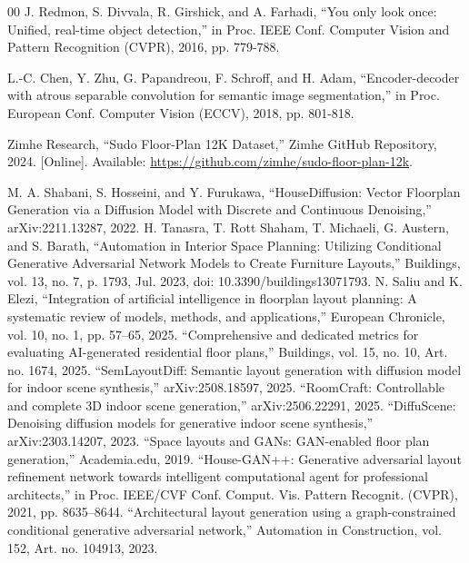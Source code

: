 \documentclass[10pt,conference]{IEEEtran}
\begin{document}
\begin{thebibliography}{00}
 J. Redmon, S. Divvala, R. Girshick, and A. Farhadi, ``You only look once: Unified, real-time object detection,'' in Proc. IEEE Conf. Computer Vision and Pattern Recognition (CVPR), 2016, pp. 779-788.

 L.-C. Chen, Y. Zhu, G. Papandreou, F. Schroff, and H. Adam, ``Encoder-decoder with atrous separable convolution for semantic image segmentation,'' in Proc. European Conf. Computer Vision (ECCV), 2018, pp. 801-818.

 Zimhe Research, ``Sudo Floor-Plan 12K Dataset,'' Zimhe GitHub Repository, 2024. [Online]. Available: \url{https://github.com/zimhe/sudo-floor-plan-12k}.

 M. A. Shabani, S. Hosseini, and Y. Furukawa, ``HouseDiffusion: Vector Floorplan Generation via a Diffusion Model with Discrete and Continuous Denoising,'' arXiv:2211.13287, 2022.
 H. Tanasra, T. Rott Shaham, T. Michaeli, G. Austern, and S. Barath, “Automation in Interior Space Planning: Utilizing Conditional Generative Adversarial Network Models to Create Furniture Layouts,” Buildings, vol. 13, no. 7, p. 1793, Jul. 2023, doi: 10.3390/buildings13071793.
 N. Saliu and K. Elezi, ``Integration of artificial intelligence in floorplan layout planning: A systematic review of models, methods, and applications,'' European Chronicle, vol. 10, no. 1, pp. 57--65, 2025.
 ``Comprehensive and dedicated metrics for evaluating AI-generated residential floor plans,'' Buildings, vol. 15, no. 10, Art. no. 1674, 2025.
 ``SemLayoutDiff: Semantic layout generation with diffusion model for indoor scene synthesis,'' arXiv:2508.18597, 2025.
 ``RoomCraft: Controllable and complete 3D indoor scene generation,'' arXiv:2506.22291, 2025.
 ``DiffuScene: Denoising diffusion models for generative indoor scene synthesis,'' arXiv:2303.14207, 2023.
 ``Space layouts and GANs: GAN-enabled floor plan generation,'' Academia.edu, 2019.
 ``House-GAN++: Generative adversarial layout refinement network towards intelligent computational agent for professional architects,'' in Proc. IEEE/CVF Conf. Comput. Vis. Pattern Recognit. (CVPR), 2021, pp. 8635--8644.
 ``Architectural layout generation using a graph-constrained conditional generative adversarial network,'' Automation in Construction, vol. 152, Art. no. 104913, 2023.



\end{thebibliography}
\end{document}
